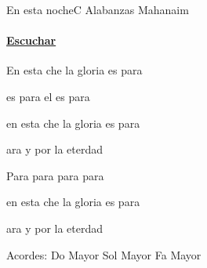 \documentclass[12pt, spanish]{book}
\begin{document}
    \begin{song}{En esta noche}{C}
        {} %
        {Alabanzas Mahanaim}
        {} %
        {}
        \ifChordBk
        \paragraph{\mbox{}\hfill\protect\href{https://open.spotify.com/intl-es/track/2KDl6QR0er27sTlynNgjYc}{Escuchar}\mbox{}\hfill}
        \fi

        \begin{SBChorus}
            En esta che la gloria es para 

            es para el es para 

            en esta che la gloria es para 

            ara y por la eterdad
        \end{SBChorus}

        \begin{SBOpGroup}
            Para  para  para  para 

            en esta che la gloria es para 

            ara y por la eterdad
        \end{SBOpGroup}

        \ifChordBk
        \begin{SBOpGroup}
            Acordes:
            \upchord{\C}\qquad Do Mayor \hfill
            \upchord{\G}\qquad Sol Mayor \hfill\null\break
            \upchord{\F}\qquad Fa Mayor \hfill\null\break
        \end{SBOpGroup}
        \fi
    \end{song}
\end{document}
